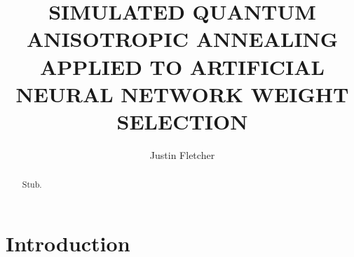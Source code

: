 \documentclass[11pt]{afthesis}
\author{Justin Fletcher}
\title{SIMULATED QUANTUM ANISOTROPIC ANNEALING APPLIED TO ARTIFICIAL NEURAL NETWORK WEIGHT SELECTION}
\begin{document}
	
	
	\flyleaf      			%
	
	\disclaimerpage                 %
	
	\titlepage			%
	
	\approvalpage                   %
	
	\begin{preface}
	\end{preface}
	
	\tableofcontents	%
	
	\listoffigures  	%
	\listoftables		%
	\listofsymbols      %
	
	\listofabbreviations
	
	
	\begin{abstract}
		Stub.
	\end{abstract}
	
	
	\chapter{Introduction}
	
\end{document}

